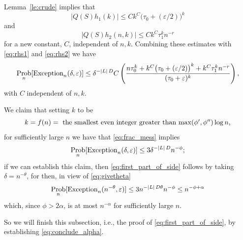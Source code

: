 \documentclass{memo-l}
\theoremstyle{plain}
\theoremstyle{definition}
\numberwithin{section}{chapter}
\numberwithin{equation}{chapter}
\DeclareMathOperator{\Prob}{Prob}
\theoremstyle{plain}
\theoremstyle{definition}
\begin{document}
Lemma~\ref{le:crude} implies that \begin{equation}\label{eq:Qh1}
|Q(S)h_1(k)| \leq Ck^C \bigl(\tau_0+(\varepsilon/2)\bigr)^k \end{equation}
and \begin{equation}\label{eq:Qh2} |Q(S)h_2(n,k)| \leq C k^C \tau_1^k
n^{-r} \end{equation} for a new constant, \( C \), independent of \( n,k
\).  Combining these estimates with \eqref{eq:rhs1} and \eqref{eq:rhs2} we
have \begin{equation}\label{eq:frac_mess} \Prob_n[{\rm
Exception}_n(\delta,\varepsilon)] \le \delta^{-|L|\,D} C \left(\frac{
n\tau_0^k + k^C \bigl(\tau_0+(\varepsilon/2)\bigr)^k + k^C \tau_1^k
n^{-r}}{ (\tau_0+\varepsilon)^k }\right), \end{equation} with \( C \)
independent of \( n,k \).

We claim that setting \( k \) to be \begin{equation}\label{eq:givek} k
=f(n)= \ \mbox{the smallest even integer greater than \(
\max(\phi',\phi'')\log n \)}, \end{equation} for sufficiently large \( n \)
we have that \eqref{eq:frac_mess} implies
\begin{equation}\label{eq:conclude_alpha} \Prob_n[{\rm
Exception}_n(\delta,\varepsilon)] \le 3 \delta^{-|L|\,D} n^{-\phi};
\end{equation} 
if we can establish this claim,
then \eqref{eq:first_part_of_side} follows by taking
\( \delta=n^{-\theta} \), for then, in view of \eqref{eq:givetheta} \[
\Prob_n[{\rm Exception}_n(n^{-\theta},\varepsilon)] \le 3 n^{-|L|\,D\theta}
n^{-\phi} \leq n^{-\phi+\alpha} \] which, since \( \phi>2\alpha \), is at
most \( n^{-\alpha} \) for sufficiently large $n$.

So we will finish this subsection, i.e., the proof of
\eqref{eq:first_part_of_side}, by establishing \eqref{eq:conclude_alpha}.
\end{document}
